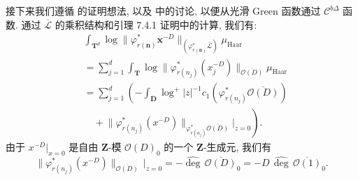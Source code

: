 接下来我们遵循 \cite[定理 10.5.3]{Bos20} 的证明想法, 
以及 \cite[第 4.2--4.3 节]{BC22} 中的讨论, 以便从光滑 Green 函数通过 \(\mathcal{C}^{b\Delta}\) 函数. 
通过 \(\overline{\mathcal{L}}\) 的乘积结构和引理 7.4.1 证明中的计算, 我们有:
\begin{equation}\label{eq:8.2.17}
\begin{aligned}
&\int_{\mathbf{T}^{d}} \log \|\varphi_{r(\mathbf{n})}^{*} \mathbf{x}^{-D}\|_{(\varphi_{r(\mathbf{n})}^{*}\overline{\mathcal{L}})} \mu_{\text{Haar}} \\
&= \sum_{j=1}^{d} \int_{\mathbf{T}} \log \|\varphi_{r(n_{j})}^{*}(x_{j}^{-D})\|_{\overline{\mathcal{O}(D)}} \mu_{\text{Haar}} \\
&= \sum_{j=1}^{d} \left( -\int_{\overline{\mathbf{D}}} \log^{+} |z|^{-1} c_{1} \left( \varphi_{r(n_{j})}^{*} \overline{\mathcal{O}(D)} \right) \right. \\
&\quad + \left. \|\varphi_{r(n_{j})}^{*}(x^{-D})\|_{\varphi_{r(n_{j})}^{*} \overline{\mathcal{O}(D)}} \Big|_{z=0} \right).
\end{aligned}
\end{equation}
由于 \(x^{-D}|_{x=0}\) 是自由 \(\mathbf{Z}\)-模 \(\mathcal{O}(D)_0\) 的一个 \(\mathbf{Z}\)-生成元, 我们有
\[ \|\varphi_{r(n_j)}^*(x^{-D})\|_{\overline{\mathcal{O}(D)}}\,\Big|_{z=0} = -\widehat{\operatorname{deg}}\,\overline{\mathcal{O}(D)}_0 = -D\,\widehat{\operatorname{deg}}\,\overline{\mathcal{O}(1)}_0. \]

